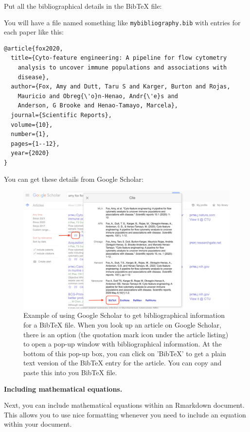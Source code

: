 \documentclass[]{tufte-book}
\begin{document}
Put all the bibliographical details in the BibTeX file:

You will have a file named something like \texttt{mybibliography.bib}
with entries for each paper like this:

\begin{verbatim}
@article{fox2020,
  title={Cyto-feature engineering: A pipeline for flow cytometry 
    analysis to uncover immune populations and associations with 
    disease},
  author={Fox, Amy and Dutt, Taru S and Karger, Burton and Rojas, 
    Mauricio and Obreg{\'o}n-Henao, Andr{\'e}s and 
    Anderson, G Brooke and Henao-Tamayo, Marcela},
  journal={Scientific Reports},
  volume={10},
  number={1},
  pages={1--12},
  year={2020}
}
\end{verbatim}

You can get these details from Google Scholar:

\begin{figure}
\includegraphics[width=\textwidth]{figures/google_scholar} \caption[Example of using Google Scholar to get bibliographical information for a BibTeX file]{Example of using Google Scholar to get bibliographical information for a BibTeX file. When you look up an article on Google Scholar, there is an option (the quotation mark icon under the article listing) to open a pop-up window with bibliographical information. At the bottom of this pop-up box, you can click on 'BibTeX' to get a plain text version of the BibTeX entry for the article. You can copy and paste this into you BibTeX file.}\label{fig:unnamed-chunk-35}
\end{figure}

\textbf{Including mathematical equations.}

Next, you can include mathematical equations within an
Rmarkdown document. This allows you to use nice formatting whenever you need
to include an equation within your document.
\end{document}
